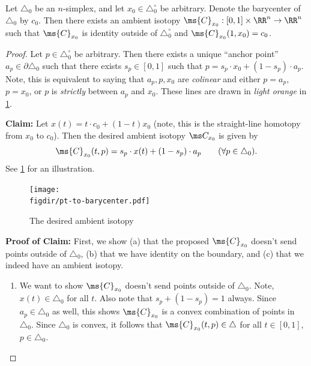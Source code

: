 \begin{proposition}\label{prop:pt-to-barycenter}
  Let $\triangle_0$ be an $n$-simplex, and let $x_0 \in
  \triangle_0^\circ$ be arbitrary. Denote the barycenter of
  $\triangle_0$ by $c_0$. Then there exists an ambient isotopy
  $\ms{C}_{x_0} : [0,1] \times \RR^n \to \RR^n$ such that
  $\ms{C}_{x_0}$ is identity outside of $\triangle_0^\circ$ and
  $\ms{C}_{x_0}(1, x_0) = c_0$.
\end{proposition}
\begin{proof}
  Let $p \in \triangle_0^\circ$ be arbitrary. Then there exists a
  unique ``anchor point'' $a_p \in \partial \triangle_0$ such that
  there exists $s_p \in [0,1]$ such that $p = s_p \cdot x_0 +
  (1-s_p) \cdot a_p$. Note, this is equivalent to saying that
  $a_p, p, x_0$ are \emph{colinear} and either $p = a_p$, $p =
  x_0$, or $p$ is \emph{strictly} between $a_p$ and $x_0$. These
  lines are drawn in \emph{light orange} in
  \cref{fig:pt-to-barycenter}.


  \textbf{Claim:} Let $x(t) = t \cdot c_0 + (1-t)x_0$ (note, this
  is the straight-line homotopy from $x_0$ to $c_0$). Then the
  desired ambient isotopy $\ms C_{x_0}$ is given by
  \[
    \ms{C}_{x_0}(t, p) = s_p \cdot x(t) + (1-s_p) \cdot a_p
    \tag{$\forall p \in \triangle_0$}.
  \]
  See \cref{fig:pt-to-barycenter} for an illustration.
  \begin{figure}[H]
    \centering
    \texttt{[image: \\figdir/pt-to-barycenter.pdf]}
    \caption{The desired ambient isotopy}
    \label{fig:pt-to-barycenter}
  \end{figure}
  \textbf{Proof of Claim:} First, we show (a) that the proposed
  $\ms{C}_{x_0}$ doesn't send points outside of $\triangle_0$, (b)
  that we have identity on the boundary, and (c) that we indeed
  have an ambient isotopy.
  \begin{enumerate}
    \item We want to show $\ms{C}_{x_0}$ doesn't send points outside
      of $\triangle_0$. Note, $x(t) \in \triangle_0$ for all $t$. Also
      note that $s_p + (1 - s_p) = 1$ always. Since $a_p \in
      \triangle_0$ as well, this shows $\ms{C}_{x_0}$ is a convex
      combination of points in $\triangle_0$. Since $\triangle_0$ is
      convex, it follows that $\ms{C}_{x_0}(t,p) \in \triangle$ for
      all $t \in [0,1]$, $p \in \triangle_0$. \cmark


\end{enumerate}
\end{proof}
